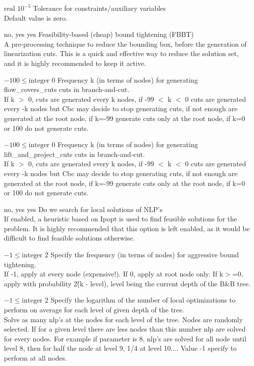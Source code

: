 %
{$\textrm{real}$}%
{$10^{- 5}$}%
{Tolerance for constraints/auxiliary variables\\
Default value is zero.}%
{}

%
{no, yes}%
{yes}%
{Feasibility-based (cheap) bound tightening (FBBT)\\
A pre-processing technique to reduce the bounding box, before the generation of linearization cuts. This is a quick and effective way to reduce the solution set, and it is highly recommended to keep it active.}%
{}

%
{$-100\leq\textrm{integer}$}%
{$0$}%
{Frequency k (in terms of nodes) for generating flow\_covers\_cuts cuts in branch-and-cut.\\
If k $>$ 0, cuts are generated every k nodes, if -99 $<$ k $<$ 0 cuts are generated every -k nodes but Cbc may decide to stop generating cuts, if not enough are generated at the root node, if k=-99 generate cuts only at the root node, if k=0 or 100 do not generate cuts.}%
{}

%
{$-100\leq\textrm{integer}$}%
{$0$}%
{Frequency k (in terms of nodes) for generating lift\_and\_project\_cuts cuts in branch-and-cut.\\
If k $>$ 0, cuts are generated every k nodes, if -99 $<$ k $<$ 0 cuts are generated every -k nodes but Cbc may decide to stop generating cuts, if not enough are generated at the root node, if k=-99 generate cuts only at the root node, if k=0 or 100 do not generate cuts.}%
{}

%
{no, yes}%
{yes}%
{Do we search for local solutions of NLP's\\
If enabled, a heuristic based on Ipopt is used to find feasible solutions for the problem. It is highly recommended that this option is left enabled, as it would be difficult to find feasible solutions otherwise.}%
{}

%
{$-1\leq\textrm{integer}$}%
{$2$}%
{Specify the frequency (in terms of nodes) for aggressive bound tightening.\\
If -1, apply at every node (expensive!). If 0, apply at root node only. If k$>$=0, apply with probability 2\^(k - level), level being the current depth of the B\&B tree.}%
{}

%
{$-1\leq\textrm{integer}$}%
{$2$}%
{Specify the logarithm of the number of local optimizations to perform on average for each level of given depth of the tree.\\
Solve as many nlp's at the nodes for each level of the tree. Nodes are randomly selected. If for a given level there are less nodes than this number nlp are solved for every nodes. For example if parameter is 8, nlp's are solved for all node until level 8, then for half the node at level 9, 1/4 at level 10.... Value -1 specify to perform at all nodes.}%
{}


